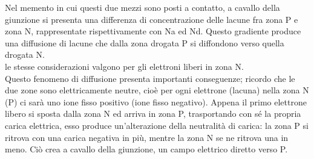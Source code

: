 %
\noindent\begin{minipage}{0.55\textwidth}
Nel memento in cui questi due mezzi sono posti a contatto, a cavallo della giunzione si presenta una differenza di concentrazione delle lacune fra zona P e zona N, rappresentate rispettivamente con Na ed Nd.
Questo gradiente produce una diffusione di lacune che dalla zona drogata P si diffondono verso quella drogata N.\\
le stesse considerazioni valgono per gli elettroni liberi in zona N.\\
Questo fenomeno di diffusione presenta importanti conseguenze;
ricordo che le due zone sono elettricamente neutre, cioè per ogni elettrone (lacuna) nella zona N (P) ci sarà uno ione fisso positivo (ione fisso negativo).
Appena il primo elettrone libero si sposta dalla zona N ed arriva in zona P, trasportando con sé la propria carica elettrica, esso produce un'alterazione della neutralità di carica: la zona P si ritrova con una carica negativa in più, mentre la zona N se ne ritrova una in meno.
Ciò crea a cavallo della giunzione, un campo elettrico diretto verso P.\\
\end{minipage}
\hfill%
\begin{minipage}{0.4\textwidth}\raggedleft
    \begin{center}
\end{center}
\end{minipage}

